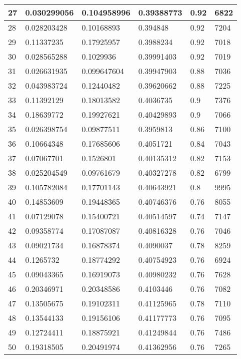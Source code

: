 \begin{longtable}{|l|l|l|l|l|l|}
27 & 0.030299056 & 0.104958996 & 0.39388773 & 0.92 & 6822 \\ \hline 
28 & 0.028203428 & 0.10168893 & 0.394848 & 0.92 & 7204 \\ \hline 
29 & 0.11337235 & 0.17925957 & 0.3988234 & 0.92 & 7018 \\ \hline 
30 & 0.028565288 & 0.1029936 & 0.39991403 & 0.92 & 7019 \\ \hline 
31 & 0.026631935 & 0.099647604 & 0.39947903 & 0.88 & 7036 \\ \hline 
32 & 0.043983724 & 0.12440482 & 0.39620662 & 0.88 & 7225 \\ \hline 
33 & 0.11392129 & 0.18013582 & 0.4036735 & 0.9 & 7376 \\ \hline 
34 & 0.18639772 & 0.19927621 & 0.40429893 & 0.9 & 7066 \\ \hline 
35 & 0.026398754 & 0.09877511 & 0.3959813 & 0.86 & 7100 \\ \hline 
36 & 0.10664348 & 0.17685606 & 0.4051721 & 0.84 & 7043 \\ \hline 
37 & 0.07067701 & 0.1526801 & 0.40135312 & 0.82 & 7153 \\ \hline 
38 & 0.025204549 & 0.09761679 & 0.40327278 & 0.82 & 6799 \\ \hline 
39 & 0.105782084 & 0.17701143 & 0.40643921 & 0.8 & 9995 \\ \hline 
40 & 0.14853609 & 0.19448365 & 0.40746376 & 0.76 & 8055 \\ \hline 
41 & 0.07129078 & 0.15400721 & 0.40514597 & 0.74 & 7147 \\ \hline 
42 & 0.09358774 & 0.17087087 & 0.40816328 & 0.76 & 7046 \\ \hline 
43 & 0.09021734 & 0.16878374 & 0.4090037 & 0.78 & 8259 \\ \hline 
44 & 0.1265732 & 0.18774292 & 0.40754923 & 0.76 & 6924 \\ \hline 
45 & 0.09043365 & 0.16919073 & 0.40980232 & 0.76 & 7628 \\ \hline 
46 & 0.20346971 & 0.20348586 & 0.4103446 & 0.76 & 7082 \\ \hline 
47 & 0.13505675 & 0.19102311 & 0.41125965 & 0.78 & 7110 \\ \hline 
48 & 0.13544133 & 0.19156106 & 0.41177773 & 0.76 & 7095 \\ \hline 
49 & 0.12724411 & 0.18875921 & 0.41249844 & 0.76 & 7486 \\ \hline 
50 & 0.19318505 & 0.20491974 & 0.41362956 & 0.76 & 7265 \\ \hline 
\end{longtable}